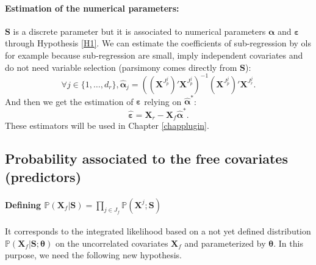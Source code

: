 \documentclass[12pt,a4paper]{report}
\begin{document}
\paragraph{Estimation of the numerical parameters:}
	$\boldsymbol{S}$ is a discrete parameter but it is associated to numerical parameters $\boldsymbol{\alpha}$ and $\boldsymbol{\varepsilon}$ through Hypothesis \ref{H1}.
	We can estimate the coefficients of sub-regression by {\sc ols} for example because sub-regression are small, imply independent covariates and do not need variable selection (parsimony comes directly from $\boldsymbol{S}$):
	\begin{equation}
	 \forall j \in \{1,\dots,d_r \}, \hat{\boldsymbol{\alpha}}_j=((\boldsymbol{X}^{J_p^j})' \boldsymbol{X}^{J_p^j})^{-1} (\boldsymbol{X}^{J_p^j})'\boldsymbol{X}^{J_r^j} .\label{estimalpha}
\end{equation}	 
And then we get the estimation of $\boldsymbol{\varepsilon}$ relying on $\hat{\boldsymbol{\alpha}}^*$:
	\begin{equation}
		\hat{\boldsymbol{\varepsilon}}=\boldsymbol{X}_r-\boldsymbol{X}_f\hat{\boldsymbol{\alpha}}^* . \label{epsilonchapeau}
	\end{equation}
	These estimators will be used in Chapter \ref{chapplugin}.
	
\subsection{Probability associated to the free covariates (predictors)}\label{sectionfullgen}
\paragraph{Defining $\mathbb{P}(\boldsymbol{X}_f|\boldsymbol{S})=\prod_{j\in J_f}\mathbb{P}(\boldsymbol{X}^j;\boldsymbol{S})$} It corresponds to the integrated likelihood based on a not yet defined distribution $\mathbb{P}(\boldsymbol{X}_f|\boldsymbol{S};\boldsymbol{\theta})$ on the uncorrelated covariates $\boldsymbol{X}_f$ and parameterized by $\boldsymbol{\theta}$. In this purpose, we need the following new hypothesis.
\end{document}

